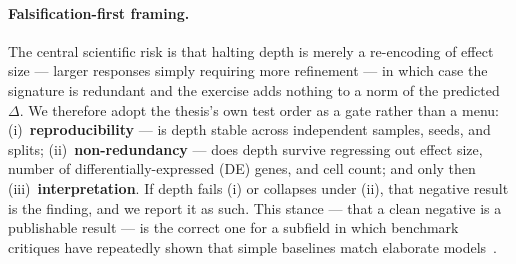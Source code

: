 \documentclass[11pt]{article}
\begin{document}
\paragraph{Falsification-first framing.} The central scientific risk is that halting depth is
merely a re-encoding of effect size --- larger responses simply requiring more refinement --- in
which case the signature is redundant and the exercise adds nothing to a norm of the predicted
$\Delta$. We therefore adopt the thesis's own test order as a gate rather than a menu:
(i)~\textbf{reproducibility} --- is depth stable across independent samples, seeds, and splits;
(ii)~\textbf{non-redundancy} --- does depth survive regressing out effect size, number of
differentially-expressed (DE) genes, and cell count; and only then
(iii)~\textbf{interpretation}. If depth fails (i) or collapses under (ii), that negative result
is the finding, and we report it as such. This stance --- that a clean negative is a publishable
result --- is the correct one for a subfield in which benchmark critiques have repeatedly shown
that simple baselines match elaborate models~\cite{ahlmann2024,kernfeld2023,csendes2025}.
\end{document}
